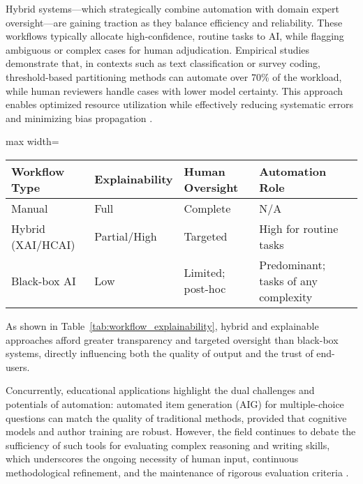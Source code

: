 Hybrid systems—which strategically combine automation with domain expert oversight—are gaining traction as they balance efficiency and reliability. These workflows typically allocate high-confidence, routine tasks to AI, while flagging ambiguous or complex cases for human adjudication. Empirical studies demonstrate that, in contexts such as text classification or survey coding, threshold-based partitioning methods can automate over 70\% of the workload, while human reviewers handle cases with lower model certainty. This approach enables optimized resource utilization while effectively reducing systematic errors and minimizing bias propagation \cite{ref82,ref83,ref86,ref88,ref94,ref96,ref97}. 

\begin{table*}[htbp]
\centering
\caption{Comparison of Explainability and Oversight Across Workflow Types}
\label{tab:workflow_explainability}
\begin{adjustbox}{max width=\textwidth}
\begin{tabular}{@{}llll@{}}
\toprule
\textbf{Workflow Type} & \textbf{Explainability} & \textbf{Human Oversight} & \textbf{Automation Role} \\
\midrule
Manual & Full & Complete & N/A \\
Hybrid (XAI/HCAI) & Partial/High & Targeted & High for routine tasks \\
Black-box AI & Low & Limited; post-hoc & Predominant; tasks of any complexity \\
\bottomrule
\end{tabular}
\end{adjustbox}
\end{table*}

As shown in Table~\ref{tab:workflow_explainability}, hybrid and explainable approaches afford greater transparency and targeted oversight than black-box systems, directly influencing both the quality of output and the trust of end-users.

Concurrently, educational applications highlight the dual challenges and potentials of automation: automated item generation (AIG) for multiple-choice questions can match the quality of traditional methods, provided that cognitive models and author training are robust. However, the field continues to debate the sufficiency of such tools for evaluating complex reasoning and writing skills, which underscores the ongoing necessity of human input, continuous methodological refinement, and the maintenance of rigorous evaluation criteria \cite{ref76,ref78,ref80,ref81}.

